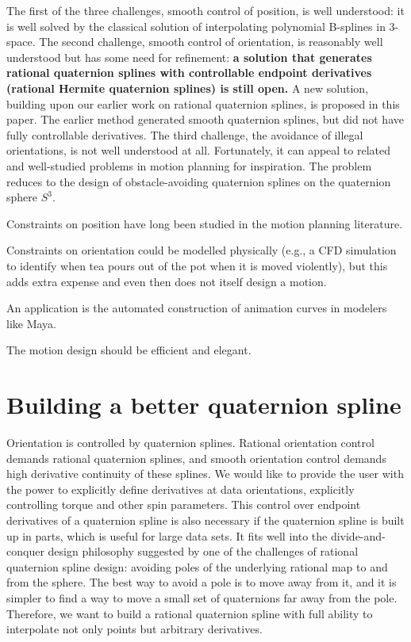 \documentclass[12pt]{article}
\begin{document}
The first of the three challenges, smooth control of position, is well understood:
it is well solved by the classical solution of interpolating polynomial B-splines 
in 3-space.
The second challenge, smooth control of orientation, is reasonably well understood 
but has some need for refinement: {\bf a solution that generates rational quaternion splines
with controllable endpoint derivatives (rational Hermite quaternion splines) 
is still open.}
A new solution, building upon our earlier work on rational quaternion splines, 
is proposed in this paper.
The earlier method generated smooth quaternion splines, 
but did not have fully controllable derivatives.
The third challenge, the avoidance of illegal orientations, is not well understood at all.
Fortunately, it can appeal to related and well-studied problems in motion planning 
for inspiration.
The problem reduces to the design of obstacle-avoiding quaternion splines on the
quaternion sphere $S^3$.

Constraints on position have long been studied in the motion planning literature.

Constraints on orientation could be modelled physically (e.g., a CFD simulation to
identify when tea pours out of the pot when it is moved violently), 
but this adds extra expense and even then does not itself design a motion.

An application is the automated construction of animation curves
in modelers like Maya.

The motion design should be efficient and elegant.

\clearpage

\section{Building a better quaternion spline}

Orientation is controlled by quaternion splines.
Rational orientation control demands rational quaternion splines, 
and smooth orientation control demands high derivative continuity of these splines.
We would like to provide the user with the power to explicitly define derivatives
at data orientations, explicitly controlling torque and other spin parameters.
This control over endpoint derivatives of a quaternion spline is also necessary
if the quaternion spline is built up in parts, which is useful for large data sets.
It fits well into the divide-and-conquer design philosophy suggested by 
one of the challenges of rational quaternion spline design: avoiding poles of the
underlying rational map to and from the sphere.
The best way to avoid a pole is to move away from it, and it is simpler to find a way
to move a small set of quaternions far away from the pole.
Therefore, we want to build a rational quaternion spline with full ability to
interpolate not only points but arbitrary derivatives.
\end{document}
